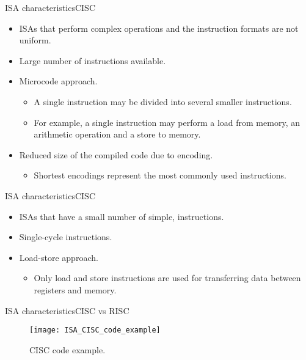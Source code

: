 \begin{frame}{\acs{ISA} characteristics}{CISC}
  \begin{itemize}
    \item \acp{ISA} that perform complex operations and the instruction formats are not uniform.
    \item Large number of instructions available.
    \item Microcode approach. 
    \begin{itemize}
      \item A single instruction may be divided into several smaller instructions. 
      \item For example, a single instruction may perform a load from memory, an arithmetic operation and a store to memory.
    \end{itemize}
    \item Reduced size of the compiled code due to  encoding. 
    \begin{itemize}
      \item Shortest encodings represent the most commonly used instructions.     
    \end{itemize}

  \end{itemize}    
\end{frame}

\begin{frame}{\acs{ISA} characteristics}{CISC}
  \begin{itemize}
    \item \acp{ISA} that have a small number of simple,  instructions.
    \item Single-cycle instructions.
    \item Load-store approach. 
    \begin{itemize}
      \item Only load and store instructions are used for transferring data between registers and memory.
    \end{itemize}
  \end{itemize}     
\end{frame}

\begin{frame}{\acs{ISA} characteristics}{CISC vs RISC}
\vspace{-8pt}
\begin{figure}
\centering
\texttt{[image: ISA\_CISC\_code\_example]}
\vspace{-12pt}
\caption{CISC code example.}
\label{Figure:CISC_code}
\end{figure}    
\end{frame}

